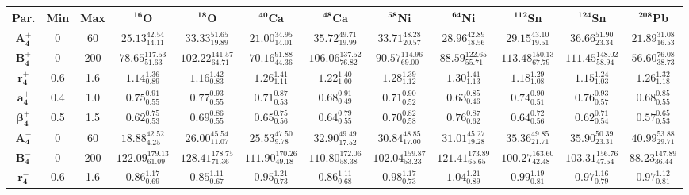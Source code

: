 \bgroup
\def\arraystretch{1.5}%
\begin{tabular}{ c c c c c c c c c c c c} 
\textbf{Par.} & \textbf{Min} & \textbf{Max} & \textbf{$\mathbf{^{16}}$O}& \textbf{$\mathbf{^{18}}$O}& \textbf{$\mathbf{^{40}}$Ca}& \textbf{$\mathbf{^{48}}$Ca}& \textbf{$\mathbf{^{58}}$Ni}& \textbf{$\mathbf{^{64}}$Ni}& \textbf{$\mathbf{^{112}}$Sn}& \textbf{$\mathbf{^{124}}$Sn}& \textbf{$\mathbf{^{208}}$Pb}\\
 \hline 
$\mathbf{A_{4}^{+}}$ & 0 & 60 & $25.13^{42.54}_{14.11}$ & $33.33^{51.65}_{19.89}$ & $21.00^{34.95}_{14.01}$ & $35.72^{49.71}_{19.99}$ & $33.71^{48.28}_{20.57}$ & $28.96^{42.89}_{18.56}$ & $29.15^{43.10}_{19.51}$ & $36.66^{51.90}_{23.34}$ & $21.89^{31.08}_{16.53}$\\ 
$\mathbf{B_{4}^{+}}$ & 0 & 200 & $78.65^{117.53}_{51.63}$ & $102.22^{141.57}_{64.71}$ & $70.16^{91.88}_{44.36}$ & $106.06^{137.52}_{76.82}$ & $90.57^{114.96}_{69.00}$ & $88.59^{122.65}_{55.71}$ & $113.48^{150.13}_{67.79}$ & $111.45^{148.02}_{58.94}$ & $56.60^{76.08}_{38.73}$\\ 
$\mathbf{r_{4}^{+}}$ & 0.6 & 1.6 & $1.14^{1.36}_{0.89}$ & $1.16^{1.42}_{0.83}$ & $1.26^{1.41}_{1.11}$ & $1.22^{1.40}_{1.00}$ & $1.28^{1.39}_{1.12}$ & $1.30^{1.41}_{1.13}$ & $1.18^{1.29}_{1.08}$ & $1.15^{1.24}_{1.03}$ & $1.26^{1.32}_{1.18}$\\ 
$\mathbf{a_{4}^{+}}$ & 0.4 & 1.0 & $0.75^{0.91}_{0.55}$ & $0.77^{0.93}_{0.55}$ & $0.71^{0.87}_{0.53}$ & $0.68^{0.91}_{0.49}$ & $0.71^{0.90}_{0.52}$ & $0.63^{0.85}_{0.46}$ & $0.74^{0.90}_{0.51}$ & $0.76^{0.93}_{0.57}$ & $0.68^{0.85}_{0.55}$\\ 
$\mathbf{\beta_{4}^{+}}$ & 0.5 & 1.5 & $0.62^{0.75}_{0.53}$ & $0.69^{0.86}_{0.55}$ & $0.65^{0.75}_{0.56}$ & $0.64^{0.79}_{0.55}$ & $0.70^{0.82}_{0.58}$ & $0.76^{0.87}_{0.62}$ & $0.64^{0.72}_{0.56}$ & $0.62^{0.71}_{0.54}$ & $0.57^{0.65}_{0.53}$\\ 
$\mathbf{A_{4}^{-}}$ & 0 & 60 & $18.88^{42.52}_{4.25}$ & $26.00^{45.54}_{11.07}$ & $25.53^{47.50}_{9.78}$ & $32.90^{49.49}_{17.52}$ & $30.84^{48.85}_{17.00}$ & $31.01^{45.27}_{19.28}$ & $35.36^{49.85}_{21.71}$ & $35.90^{50.39}_{23.31}$ & $40.99^{53.88}_{29.71}$\\ 
$\mathbf{B_{4}^{-}}$ & 0 & 200 & $122.09^{179.13}_{61.09}$ & $128.41^{178.75}_{71.36}$ & $111.90^{170.26}_{49.18}$ & $110.80^{172.06}_{58.38}$ & $102.04^{159.87}_{53.23}$ & $121.41^{173.89}_{65.65}$ & $100.27^{163.60}_{42.48}$ & $103.31^{156.76}_{47.54}$ & $88.23^{147.89}_{36.44}$\\ 
$\mathbf{r_{4}^{-}}$ & 0.6 & 1.6 & $0.86^{1.17}_{0.69}$ & $0.85^{1.11}_{0.67}$ & $0.95^{1.21}_{0.73}$ & $0.86^{1.11}_{0.68}$ & $0.98^{1.17}_{0.73}$ & $1.04^{1.21}_{0.89}$ & $0.99^{1.19}_{0.81}$ & $0.97^{1.16}_{0.79}$ & $0.97^{1.12}_{0.81}$\\ 

\end{tabular}
